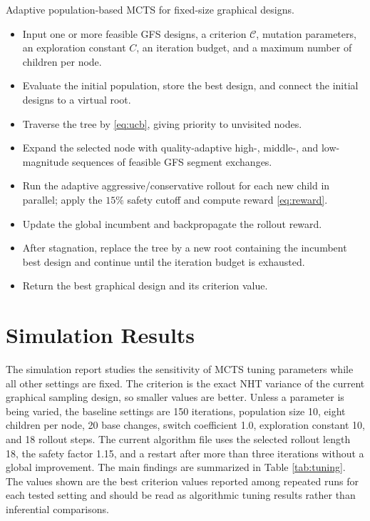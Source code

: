 \documentclass[twoside]{article}
\newcommand{\Crit}{\mathcal{C}}
\begin{document}
\begin{alg}\label{alg:mcts}
Adaptive population-based MCTS for fixed-size graphical designs.
\begin{itemize}
\item Input one or more feasible GFS designs, a criterion $\Crit$, mutation
      parameters, an exploration constant $C$, an iteration budget, and a
      maximum number of children per node.
\item Evaluate the initial population, store the best design, and connect the
      initial designs to a virtual root.
\item Traverse the tree by \eqref{eq:ucb}, giving priority to unvisited nodes.
\item Expand the selected node with quality-adaptive high-, middle-, and
      low-magnitude sequences of feasible GFS segment exchanges.
\item Run the adaptive aggressive/conservative rollout for each new child in
      parallel; apply the $15\%$ safety cutoff and compute reward
      \eqref{eq:reward}.
\item Update the global incumbent and backpropagate the rollout reward.
\item After stagnation, replace the tree by a new root containing the incumbent
      best design and continue until the iteration budget is exhausted.
\item Return the best graphical design and its criterion value.
\end{itemize}
\end{alg}

\section{Simulation Results}

The simulation report studies the sensitivity of MCTS tuning parameters while
all other settings are fixed. The criterion is the exact NHT variance of the
current graphical sampling design, so smaller values are better. Unless a
parameter is being varied, the baseline settings are 150 iterations, population
size 10, eight children per node, 20 base changes, switch coefficient 1.0,
exploration constant 10, and 18 rollout steps. The current algorithm file uses
the selected rollout length 18, the safety factor 1.15, and a restart after more
than three iterations without a global improvement. The main findings are
summarized in Table \ref{tab:tuning}. The values shown are the best criterion
values reported among repeated runs for each tested setting and should be read
as algorithmic tuning results rather than inferential comparisons.
\end{document}
